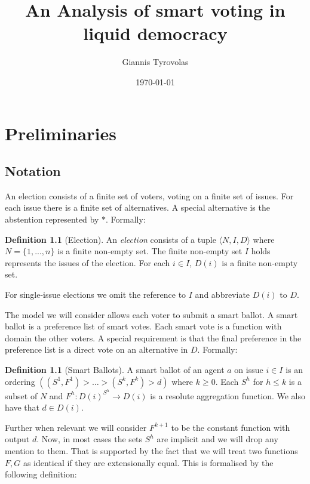 \documentclass[11pt,a4paper, titlepage]{report}
\title{An Analysis of smart voting in liquid democracy}
\author{Giannis Tyrovolas}
\date{\today}
\theoremstyle{definition}
\newtheorem{definition}[theorem]{Definition}
\begin{document}
\maketitle

\tableofcontents

\chapter{Preliminaries}

\section{Notation}


An election consists of a finite set of voters, voting on a finite set of issues. For each issue there is a finite set of alternatives. A special alternative is the abstention represented by $*$. Formally:

\begin{definition}[Election]
    An \emph{election} consists of a tuple $\langle N, I, D\rangle $ where $N = \{1,..., n\} $ is a finite non-empty set. The finite non-empty set $I$ holds represents the issues of the election. For each $i \in I$, $D(i)$ is a finite non-empty set.
\end{definition}

For single-issue elections we omit the reference to $I$ and abbreviate $D(i)$ to $D$.

The model we will consider allows each voter to submit a smart ballot. A smart ballot is a preference list of smart votes. Each smart vote is a function with domain the other voters. A special requirement is that the final preference in the preference list is a direct vote on an alternative in $D$. Formally:

\begin{definition}[Smart Ballots]
    A smart ballot of an agent $a$ on issue $i \in I$ is an ordering $( (S^1, F^1) > \ldots > (S^k, F^k) > d)$ where $k \geq 0$. Each $S^h$ for $h \leq k$ is a subset of $N$ and $F^h \colon D(i)^{S^h} \longrightarrow D(i)$ is a resolute aggregation function. We also have that $d \in D(i)$.   
\end{definition}

Further when relevant we will consider $F^{k+1}$ to be the constant function with output $d$. Now, in most cases the sets $S^h$ are implicit and we will drop any mention to them. That is supported by the fact that we will treat two functions $F, G$ as identical if they are extensionally equal. This is formalised by the following definition:
\end{document}

